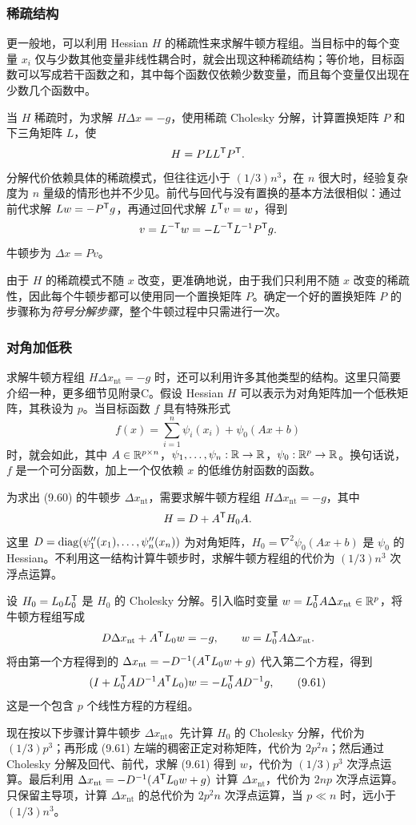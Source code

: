 \subsubsection*{稀疏结构}
更一般地，可以利用 Hessian $H$ 的稀疏性来求解牛顿方程组。当目标中的每个变量 $x_i$ 仅与少数其他变量非线性耦合时，就会出现这种稀疏结构；等价地，目标函数可以写成若干函数之和，其中每个函数仅依赖少数变量，而且每个变量仅出现在少数几个函数中。

当 $H$ 稀疏时，为求解 $H\Delta x=-g$，使用稀疏 Cholesky 分解，计算置换矩阵 $P$ 和下三角矩阵 $L$，使
\[
 H=PLL^\mathsf T P^\mathsf T.
\]
分解代价依赖具体的稀疏模式，但往往远小于 $(1/3)n^3$，在 $n$ 很大时，经验复杂度为 $n$ 量级的情形也并不少见。前代与回代与没有置换的基本方法很相似：通过前代求解 $Lw=-P^\mathsf T g$，再通过回代求解 $L^\mathsf T v=w$，得到
\[
 v=L^{-\mathsf T}w=-L^{-\mathsf T}L^{-1}P^\mathsf T g.
\]
牛顿步为 $\Delta x=Pv$。

由于 $H$ 的稀疏模式不随 $x$ 改变，更准确地说，由于我们只利用不随 $x$ 改变的稀疏性，因此每个牛顿步都可以使用同一个置换矩阵 $P$。确定一个好的置换矩阵 $P$ 的步骤称为\emph{符号分解步骤}，整个牛顿过程中只需进行一次。

\subsubsection*{对角加低秩}
求解牛顿方程组 $H\Delta x_{\mathrm{nt}}=-g$ 时，还可以利用许多其他类型的结构。这里只简要介绍一种，更多细节见附录C。假设 Hessian $H$ 可以表示为对角矩阵加一个低秩矩阵，其秩设为 $p$。当目标函数 $f$ 具有特殊形式
\begin{equation}
 f(x)=\sum_{i=1}^n\psi_i(x_i)+\psi_0(Ax+b)\tag{9.60}
\end{equation}
时，就会如此，其中 $A\in\mathbb R^{p\times n}$，$\psi_1,\ldots,\psi_n:\mathbb R\to\mathbb R$，$\psi_0:\mathbb R^p\to\mathbb R$。换句话说，$f$ 是一个可分函数，加上一个仅依赖 $x$ 的低维仿射函数的函数。

为求出 (9.60) 的牛顿步 $\Delta x_{\mathrm{nt}}$，需要求解牛顿方程组 $H\Delta x_{\mathrm{nt}}=-g$，其中
\[
 H=D+A^\mathsf T H_0A.
\]
这里 $D=\operatorname{diag}(\psi_1''(x_1),\ldots,\psi_n''(x_n))$ 为对角矩阵，$H_0=\nabla^2\psi_0(Ax+b)$ 是 $\psi_0$ 的 Hessian。不利用这一结构计算牛顿步时，求解牛顿方程组的代价为 $(1/3)n^3$ 次浮点运算。

设 $H_0=L_0L_0^\mathsf T$ 是 $H_0$ 的 Cholesky 分解。引入临时变量 $w=L_0^\mathsf T A\Delta x_{\mathrm{nt}}\in\mathbb R^p$，将牛顿方程组写成
\[
 D\Delta x_{\mathrm{nt}}+A^\mathsf T L_0w=-g,\qquad
 w=L_0^\mathsf T A\Delta x_{\mathrm{nt}}.
\]
将由第一个方程得到的 $\Delta x_{\mathrm{nt}}=-D^{-1}(A^\mathsf T L_0w+g)$ 代入第二个方程，得到
\begin{equation}
 (I+L_0^\mathsf T AD^{-1}A^\mathsf T L_0)w=-L_0^\mathsf T AD^{-1}g,\tag{9.61}
\end{equation}
这是一个包含 $p$ 个线性方程的方程组。

现在按以下步骤计算牛顿步 $\Delta x_{\mathrm{nt}}$。先计算 $H_0$ 的 Cholesky 分解，代价为 $(1/3)p^3$；再形成 (9.61) 左端的稠密正定对称矩阵，代价为 $2p^2n$；然后通过 Cholesky 分解及回代、前代，求解 (9.61) 得到 $w$，代价为 $(1/3)p^3$ 次浮点运算。最后利用 $\Delta x_{\mathrm{nt}}=-D^{-1}(A^\mathsf T L_0w+g)$ 计算 $\Delta x_{\mathrm{nt}}$，代价为 $2np$ 次浮点运算。只保留主导项，计算 $\Delta x_{\mathrm{nt}}$ 的总代价为 $2p^2n$ 次浮点运算，当 $p\ll n$ 时，远小于 $(1/3)n^3$。
